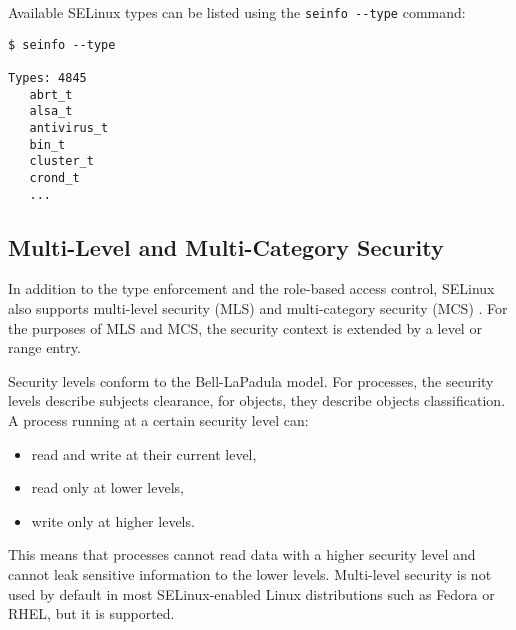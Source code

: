 \pagebreak

Available SELinux types can be listed using the \texttt{seinfo -{}-type}
command:
\begin{lstlisting}
$ seinfo --type

Types: 4845
   abrt_t
   alsa_t
   antivirus_t
   bin_t
   cluster_t
   crond_t
   ...
\end{lstlisting}

\subsection{Multi-Level and Multi-Category Security}
\label{mls}
In addition to the type enforcement and the role-based access control, SELinux
also supports multi-level security (MLS) and multi-category security (MCS)
\cite[pp.~48--53]{tsn}. For the purposes of MLS and MCS, the security context is
extended by a level or range entry.

Security levels conform to the Bell-LaPadula model. For processes, the security
levels describe subjects clearance, for objects, they describe objects
classification. A process running at a certain security level can:
\begin{itemize}
    \item read and write at their current level,
    \item read only at lower levels,
    \item write only at higher levels.
\end{itemize}
This means that processes cannot read data with a higher security level and
cannot leak sensitive information to the lower levels. Multi-level security is
not used by default in most SELinux-enabled Linux distributions such as Fedora
or RHEL, but it is supported.


